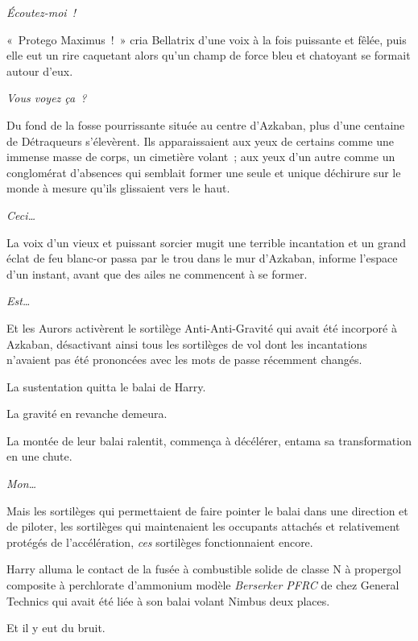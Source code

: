 \emph{Écoutez-moi~!}

«~Protego Maximus~!~»
cria Bellatrix d'une voix à la fois puissante et fêlée, puis elle eut un rire caquetant alors qu'un champ de force bleu et chatoyant se formait autour d'eux.

\emph{Vous voyez ça~?}

Du fond de la fosse pourrissante située au centre d'Azkaban, plus d'une centaine de Détraqueurs s'élevèrent.
Ils apparaissaient aux yeux de certains comme une immense masse de corps, un cimetière volant~; aux yeux d'un autre comme un conglomérat d'absences qui semblait former une seule et unique déchirure sur le monde à mesure qu'ils glissaient vers le haut.

\emph{Ceci…}

La voix d'un vieux et puissant sorcier mugit une terrible incantation et un grand éclat de feu blanc-or passa par le trou dans le mur d'Azkaban, informe l'espace d'un instant, avant que des ailes ne commencent à se former.

\emph{Est…}

Et les Aurors activèrent le sortilège Anti-Anti-Gravité qui avait été incorporé à Azkaban, désactivant ainsi tous les sortilèges de vol dont les incantations n'avaient pas été prononcées avec les mots de passe récemment changés.

La sustentation quitta le balai de Harry.

La gravité en revanche demeura.

La montée de leur balai ralentit, commença à décélérer, entama sa transformation en une chute.

\emph{Mon…}

Mais les sortilèges qui permettaient de faire pointer le balai dans une direction et de piloter, les sortilèges qui maintenaient les occupants attachés et relativement protégés de l'accélération, \emph{ces} sortilèges fonctionnaient encore.


Harry alluma le contact de la fusée à combustible solide de classe N à propergol composite à perchlorate d'ammonium modèle \emph{Berserker PFRC} de chez General Technics qui avait été liée à son balai volant Nimbus  deux places.

Et il y eut du bruit.
